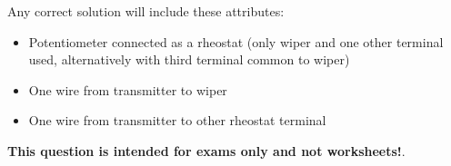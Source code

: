 Any correct solution will include these attributes:

\begin{itemize}
\item{} Potentiometer connected as a rheostat (only wiper and one other terminal used, alternatively with third terminal common to wiper)
\item{} One wire from transmitter to wiper
\item{} One wire from transmitter to other rheostat terminal
\end{itemize}







{\bf This question is intended for exams only and not worksheets!}.



